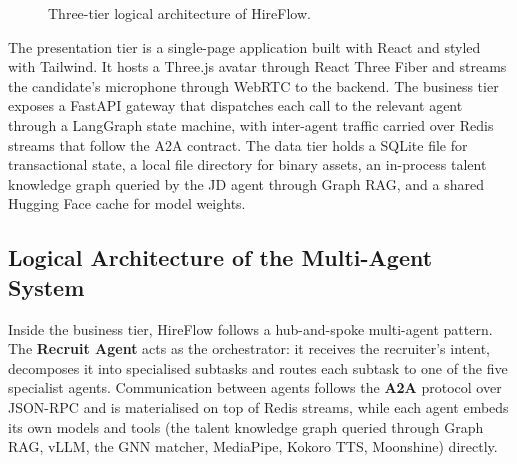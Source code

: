 \begin{figure}[H]
{{%
    }}
    \caption{Three-tier logical architecture of HireFlow.}
    \label{fig:logical-arch}
\end{figure}

The presentation tier is a single-page application built with React
and styled with Tailwind. It hosts a Three.js avatar through React
Three Fiber and streams the candidate's microphone through WebRTC
to the backend. The business tier exposes a FastAPI gateway that
dispatches each call to the relevant agent through a LangGraph
state machine, with inter-agent traffic carried over Redis streams
that follow the \acs{A2A} contract. The data tier holds a SQLite
file for transactional state, a local file directory for binary
assets, an in-process talent knowledge graph queried by the JD
agent through Graph \acs{RAG}, and a shared Hugging Face cache for
model weights.

\subsection{Logical Architecture of the Multi-Agent System}

Inside the business tier, HireFlow follows a hub-and-spoke
multi-agent pattern. The \textbf{Recruit Agent} acts as the
orchestrator: it receives the recruiter's intent, decomposes it into
specialised subtasks and routes each subtask to one of the five
specialist agents. Communication between agents follows the
\textbf{\acs{A2A}} protocol over JSON-RPC and is materialised on top
of Redis streams, while each agent embeds its own models and tools
(the talent knowledge graph queried through Graph \acs{RAG}, vLLM,
the \acs{GNN} matcher, MediaPipe, Kokoro \acs{TTS}, Moonshine)
directly.

